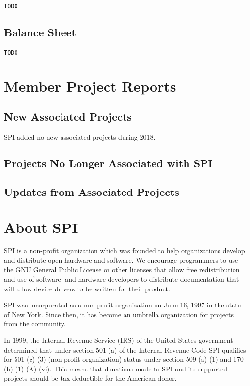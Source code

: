 \documentclass[a4paper]{report}
\begin{document}
\begin{verbatim}
TODO
\end{verbatim}

\section{Balance Sheet}

\begin{verbatim}
TODO
\end{verbatim}

\chapter{Member Project Reports}

\section{New Associated Projects}

SPI added no new associated projects during 2018.

\section{Projects No Longer Associated with SPI}

\section{Updates from Associated Projects}


\appendix
\chapter{About SPI}

SPI is a non-profit organization which was founded to help organizations
develop and distribute open hardware and software. We encourage programmers
to use the GNU General Public License or other licenses that allow free
redistribution and use of software, and hardware developers to distribute
documentation that will allow device drivers to be written for their product.

SPI was incorporated as a non-profit organization on June 16, 1997 in the state
of New York. Since then, it has become an umbrella organization for projects
from the community.

In 1999, the Internal Revenue Service (IRS) of the United States government
determined that under section 501 (a) of the Internal Revenue Code SPI
qualifies for 501 (c) (3) (non-profit organization) status under section 509
(a) (1) and 170 (b) (1) (A) (vi). This means that donations made to SPI and its
supported projects should be tax deductible for the American donor.
\end{document}
